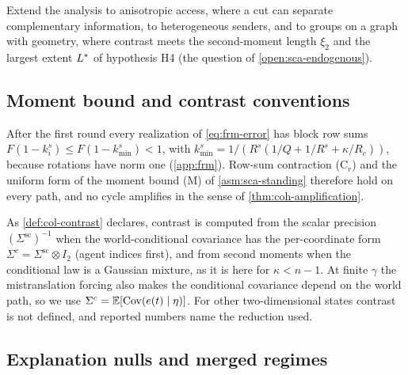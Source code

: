 \begin{openproblem}\label{open:frm-access}
Extend the analysis to anisotropic access, where a cut can separate complementary information, to heterogeneous senders, and to groups on a graph with geometry, where contrast meets the second-moment length $\xi_2$ and the largest extent $L^{\ast}$ of hypothesis H4 (the question of \cref{open:sca-endogenous}).
\end{openproblem}

\subsection{Moment bound and contrast conventions}\label{sup:frm-moment-bound-and-contrast-conventions}

\begin{remark}\label{rem:frm-moment-bound}
After the first round every realization of \eqref{eq:frm-error} has block row sums $F(1-k^s_i)\le F(1-k^s_{\min})<1$, with $k^s_{\min}=1/(R^s(1/Q+1/R^s+\kappa/R_c))$, because rotations have norm one (\cref{app:frm}). Row-sum contraction (C$_r$) and the uniform form of the moment bound (M) of \cref{asm:sca-standing} therefore hold on every path, and no cycle amplifies in the sense of \cref{thm:coh-amplification}.
\end{remark}

\begin{remark}\label{rem:frm-conventions}
As \cref{def:col-contrast} declares, contrast is computed from the scalar precision $(\Sigma^{\mathrm{sc}})^{-1}$ when the world-conditional covariance has the per-coordinate form $\Sigma^c=\Sigma^{\mathrm{sc}}\otimes I_2$ (agent indices first), and from second moments when the conditional law is a Gaussian mixture, as it is here for $\kappa<n-1$. At finite $\gamma$ the mistranslation forcing also makes the conditional covariance depend on the world path, so we use $\Sigma^c=\mathbb{E}[\operatorname{Cov}(e(t)\mid\eta)]$. For other two-dimensional states contrast is not defined, and reported numbers name the reduction used.
\end{remark}

\subsection{Explanation nulls and merged regimes}\label{sup:frm-explanation-nulls-and-merged-regimes}

